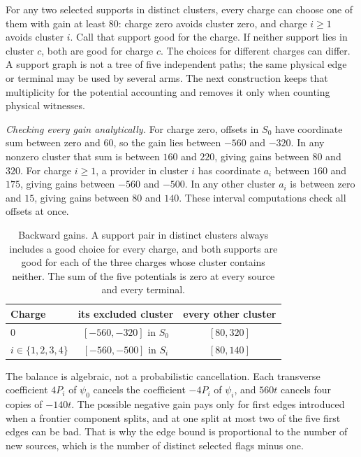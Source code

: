 For any two selected supports in distinct clusters, every charge can choose one of them with gain
at least $80$: charge zero avoids cluster zero, and charge $i\ge1$ avoids cluster $i$. Call that
support good for the charge. If neither support lies in cluster $c$, both are good for charge $c$.
The choices for different charges can differ. A support graph is not a tree of five independent
paths; the same physical edge or terminal may be used by several arms. The next construction keeps
that multiplicity for the potential accounting and removes it only when counting physical
witnesses.

\emph{Checking every gain analytically.} For charge zero, offsets in $S_0$ have coordinate sum
between zero and $60$, so the gain lies between $-560$ and $-320$. In any nonzero cluster that sum
is between $160$ and $220$, giving gains between $80$ and $320$. For charge $i\ge1$, a provider in
cluster $i$ has coordinate $a_i$ between $160$ and $175$, giving gains between $-560$ and $-500$.
In any other cluster $a_i$ is between zero and $15$, giving gains between $80$ and $140$. These
interval computations check all offsets at once.

\begin{table}[ht]
\centering\small
\begin{tabular}{lcc}
\toprule
Charge & its excluded cluster & every other cluster\\
\midrule
$0$ & $[-560,-320]$ in $S_0$ & $[80,320]$\\
$i\in\{1,2,3,4\}$ & $[-560,-500]$ in $S_i$ & $[80,140]$\\
\bottomrule
\end{tabular}
\caption{Backward gains. A support pair in distinct clusters always includes a good choice for
every charge, and both supports are good for each of the three charges whose cluster contains
neither. The sum of the five potentials is zero at every source and every terminal.}
\end{table}

The balance is algebraic, not a probabilistic cancellation. Each transverse coefficient $4P_i$ of
$\psi_0$ cancels the coefficient $-4P_i$ of $\psi_i$, and $560t$ cancels four copies of $-140t$. The
possible negative gain pays only for first edges introduced when a frontier component splits, and
at one split at most two of the five first edges can be bad. That is why the edge bound is
proportional to the number of new sources, which is the number of distinct selected flags minus
one.

